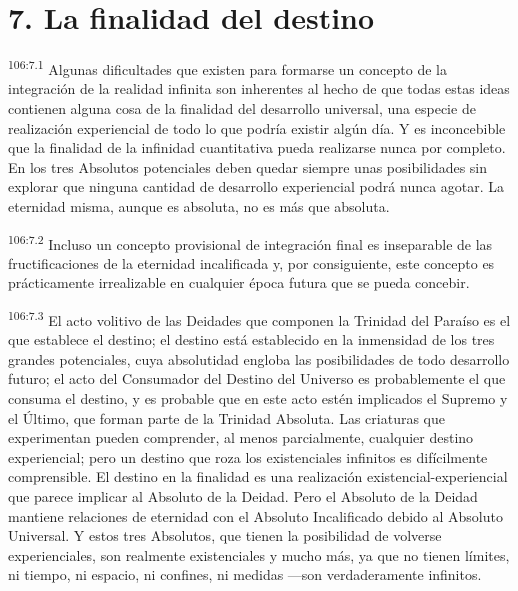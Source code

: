 \documentclass[twoside, 11pt]{book}
\begin{document}
\section*{7. La finalidad del destino}
\par
\textsuperscript{106:7.1} Algunas dificultades que existen para formarse un concepto de la integración de la realidad infinita son inherentes al hecho de que todas estas ideas contienen alguna cosa de la finalidad del desarrollo universal, una especie de realización experiencial de todo lo que podría existir algún día. Y es inconcebible que la finalidad de la infinidad cuantitativa pueda realizarse nunca por completo. En los tres Absolutos potenciales deben quedar siempre unas posibilidades sin explorar que ninguna cantidad de desarrollo experiencial podrá nunca agotar. La eternidad misma, aunque es absoluta, no es más que absoluta.

\par
\textsuperscript{106:7.2} Incluso un concepto provisional de integración final es inseparable de las fructificaciones de la eternidad incalificada y, por consiguiente, este concepto es prácticamente irrealizable en cualquier época futura que se pueda concebir.

\par
\textsuperscript{106:7.3} El acto volitivo de las Deidades que componen la Trinidad del Paraíso es el que establece el destino; el destino está establecido en la inmensidad de los tres grandes potenciales, cuya absolutidad engloba las posibilidades de todo desarrollo futuro; el acto del Consumador del Destino del Universo es probablemente el que consuma el destino, y es probable que en este acto estén implicados el Supremo y el Último, que forman parte de la Trinidad Absoluta. Las criaturas que experimentan pueden comprender, al menos parcialmente, cualquier destino experiencial; pero un destino que roza los existenciales infinitos es difícilmente comprensible. El destino en la finalidad es una realización existencial-experiencial que parece implicar al Absoluto de la Deidad. Pero el Absoluto de la Deidad mantiene relaciones de eternidad con el Absoluto Incalificado debido al Absoluto Universal. Y estos tres Absolutos, que tienen la posibilidad de volverse experienciales, son realmente existenciales y mucho más, ya que no tienen límites, ni tiempo, ni espacio, ni confines, ni medidas ---son verdaderamente infinitos.
\end{document}
